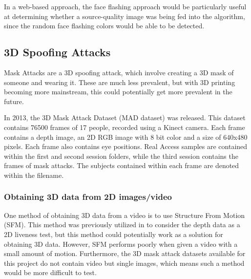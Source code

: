 \documentclass[10pt,a4paper]{article}
\begin{document}
            In a web-based approach, the face flashing approach would be particularly useful at determining whether a source-quality image was being fed into the algorithm, since the random face flashing colors would be able to be detected.
            
    \subsection{3D Spoofing Attacks}
        Mask Attacks are a 3D spoofing attack, which involve creating a 3D mask of someone and wearing it. \cite{FaceSpoofingAttacksStudy} These are much less prevalent, but with 3D printing becoming more mainstream, this
        could potentially get more prevalent in the future.

        In 2013, the 3D Mask Attack Dataset (MAD dataset) was released. This dataset contains 76500 frames of 17 people, recorded using a Kinect camera.
        Each frame contains a depth image, an 2D RGB image with 8 bit color and a size of 640x480 pixels. Each frame also contains eye positions.
        Real Access samples are contained within the first and second session folders, while the third session contains the frames of mask attacks. The subjects contained
        within each frame are denoted within the filename.
        
        \cite{3DMadDataset}

        \subsubsection{Obtaining 3D data from 2D images/video}
            One method of obtaining 3D data from a video is to use Structure From Motion (SFM). This method was previously utilized in \cite{SFMClassifier} to consider the depth data as a 2D liveness test,
            but this method could potentially work as a solution for obtaining 3D data. However, SFM performs poorly when given a video with a small amount of motion. Furthermore, the 3D mask attack datasets
            available for this project do not contain video but single images, which means such a method would be more difficult to test.
\end{document}
